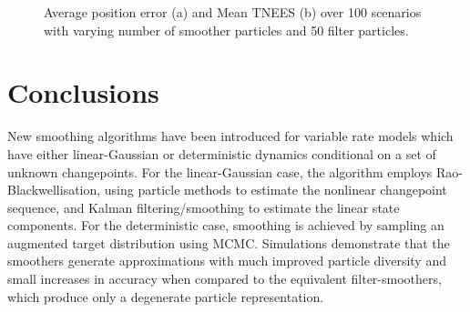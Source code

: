 \documentclass[10pt,twocolumn,twoside]{IEEEtran}
\begin{document}
\begin{figure}
\centering
{}
\caption{Average position error (a) and Mean TNEES (b) over 100 scenarios with varying number of smoother particles and 50 filter particles.}
\label{fig:varying_num_pts}
\end{figure}



\section{Conclusions}

New smoothing algorithms have been introduced for variable rate models which have either linear-Gaussian or deterministic dynamics conditional on a set of unknown changepoints. For the linear-Gaussian case, the algorithm employs Rao-Blackwellisation, using particle methods to estimate the nonlinear changepoint sequence, and Kalman filtering/smoothing to estimate the linear state components. For the deterministic case, smoothing is achieved by sampling an augmented target distribution using MCMC. Simulations demonstrate that the smoothers generate approximations with much improved particle diversity and small increases in accuracy when compared to the equivalent filter-smoothers, which produce only a degenerate particle representation.
\end{document}
